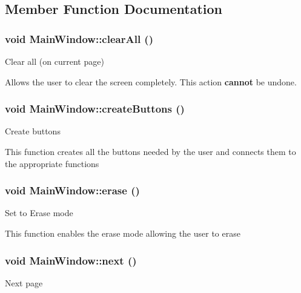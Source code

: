 \subsection{Member Function Documentation}
\hypertarget{classMainWindow_a1c308a9a316c4fad73159288dcca4375}{
\subsubsection[{clearAll}]{\setlength{\rightskip}{0pt plus 5cm}void MainWindow::clearAll ()}}
\label{classMainWindow_a1c308a9a316c4fad73159288dcca4375}
Clear all (on current page)

Allows the user to clear the screen completely. This action {\bfseries cannot} be undone. \hypertarget{classMainWindow_a3a5152074fdfc6e75c6f86e55fcba28d}{
\subsubsection[{createButtons}]{\setlength{\rightskip}{0pt plus 5cm}void MainWindow::createButtons ()}}
\label{classMainWindow_a3a5152074fdfc6e75c6f86e55fcba28d}
Create buttons

This function creates all the buttons needed by the user and connects them to the appropriate functions \hypertarget{classMainWindow_a01f536c3253476491867139572591153}{
\subsubsection[{erase}]{\setlength{\rightskip}{0pt plus 5cm}void MainWindow::erase ()}}
\label{classMainWindow_a01f536c3253476491867139572591153}
Set to Erase mode

This function enables the erase mode allowing the user to erase \hypertarget{classMainWindow_aabed273350d064a3a8d73afb01848fea}{
\subsubsection[{next}]{\setlength{\rightskip}{0pt plus 5cm}void MainWindow::next ()}}
\label{classMainWindow_aabed273350d064a3a8d73afb01848fea}
Next page

